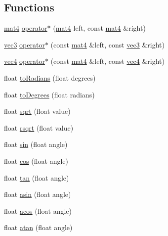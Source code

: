 \subsection*{Functions}
\begin{DoxyCompactItemize}
\item 
\hyperlink{structspork_1_1maths_1_1mat4}{mat4} \hyperlink{namespacespork_1_1maths_a88480b4756d668f2679cdb861e20225c}{operator$\ast$} (\hyperlink{structspork_1_1maths_1_1mat4}{mat4} left, const \hyperlink{structspork_1_1maths_1_1mat4}{mat4} \&right)
\item 
\hyperlink{structspork_1_1maths_1_1vec3}{vec3} \hyperlink{namespacespork_1_1maths_a69a3ee5d330b2639f489a97456b3d8a9}{operator$\ast$} (const \hyperlink{structspork_1_1maths_1_1mat4}{mat4} \&left, const \hyperlink{structspork_1_1maths_1_1vec3}{vec3} \&right)
\item 
\hyperlink{structspork_1_1maths_1_1vec4}{vec4} \hyperlink{namespacespork_1_1maths_ad74bbcba8e01344bc4d987b7ea41b001}{operator$\ast$} (const \hyperlink{structspork_1_1maths_1_1mat4}{mat4} \&left, const \hyperlink{structspork_1_1maths_1_1vec4}{vec4} \&right)
\item 
float \hyperlink{namespacespork_1_1maths_a6a8870835949f3c092e2c89a662789a6}{to\+Radians} (float degrees)
\item 
float \hyperlink{namespacespork_1_1maths_a83529daea8730dd1694895c2e1f6049a}{to\+Degrees} (float radians)
\item 
float \hyperlink{namespacespork_1_1maths_a9b6e4ae0fa6afa5d30e3c077e5c2102f}{sqrt} (float value)
\item 
float \hyperlink{namespacespork_1_1maths_a45d065f3199c9ba816f80e2b79c3cc8d}{rsqrt} (float value)
\item 
float \hyperlink{namespacespork_1_1maths_a059ac1ec891e33b831ca67a6174c8ad8}{sin} (float angle)
\item 
float \hyperlink{namespacespork_1_1maths_a65b5ef1857a065cbab527d0fa4cd92df}{cos} (float angle)
\item 
float \hyperlink{namespacespork_1_1maths_a2e3fc6759119a0890eff6b58eed1ed2a}{tan} (float angle)
\item 
float \hyperlink{namespacespork_1_1maths_abe6dcee4251fcb68523b1dc1a7f2a0c1}{asin} (float angle)
\item 
float \hyperlink{namespacespork_1_1maths_a9a93c40ad65249b72433c0b2d3502f7d}{acos} (float angle)
\item 
float \hyperlink{namespacespork_1_1maths_aec35004bae3eb4a768cb4fa1a52ad4d1}{atan} (float angle)

\end{DoxyCompactItemize}
